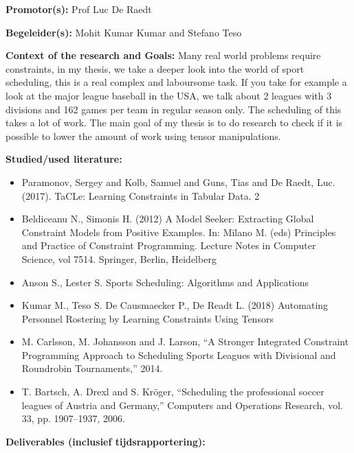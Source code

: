 \documentclass[12pt]{report}
\begin{document}
\pagestyle{myheadings}

\vspace{0.5cm}
{\bf Promotor(s):} Prof Luc De Raedt

\vspace{0.5cm}
{\bf Begeleider(s):} Mohit Kumar Kumar and Stefano Teso

\vspace{1cm}
{\bf Context of the research and Goals: } 
Many real world problems require constraints, in my thesis, we take a deeper look into the world of sport scheduling, this is a real complex and laboursome task. If you take for example a look at the major league baseball in the USA, we talk about 2 leagues with 3 divisions and 162 games per team in regular season only. The scheduling of this takes a lot of work. The main goal of my thesis is to do research to check if it is possible to lower the amount of work using tensor manipulations.

\vspace{1cm}
{\bf Studied/used literature: }
\begin{itemize}
\item Paramonov, Sergey and Kolb, Samuel and Guns, Tias and De Raedt, Luc. (2017). TaCLe: Learning Constraints in Tabular Data. 2
\item Beldiceanu N., Simonis H. (2012) A Model Seeker: Extracting Global Constraint Models from Positive Examples. In: Milano M. (eds) Principles and Practice of Constraint Programming. Lecture Notes in Computer Science, vol 7514. Springer, Berlin, Heidelberg
\item  Anson S., Lester S. Sports Scheduling: Algorithms and Applications
\item  Kumar M., Teso S. De Causmaecker P., De Readt L. (2018) Automating Personnel Rostering by Learning Constraints Using Tensors 
\item M. Carlsson, M. Johansson and J. Larson, “A Stronger Integrated Constraint
Programming Approach to Scheduling Sports Leagues with Divisional and Roundrobin
Tournaments,” 2014.
\item T. Bartsch, A. Drexl and S. Kröger, “Scheduling the professional soccer leagues of
Austria and Germany,” Computers and Operations Research, vol. 33, pp. 1907–1937,
2006.
\end{itemize}

\vspace{1cm}
{\bf Deliverables (inclusief tijdsrapportering):}
\end{document}

